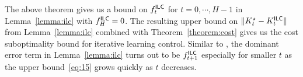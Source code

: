 The above theorem gives us a bound on $f^\mathsf{ILC}_t$ for $t=0, \cdots, H-1$
in Lemma~\ref{lemma:ilc} with $f^\mathsf{ILC}_H = 0$. The resulting upper bound
on $\|K^\star_t - K^\mathsf{ILC}_t\|$ from Lemma~\ref{lemma:ilc} combined with
Theorem~\ref{theorem:cost} gives us the cost suboptimality bound for
iterative learning control. Similar to \MM{}, the dominant error term in
Lemma~\ref{lemma:ilc} turns out to be $f^\mathsf{ILC}_{t+1}$ especially for
smaller $t$ as the upper bound~\eqref{eq:15} grows quickly as $t$ decreases.



